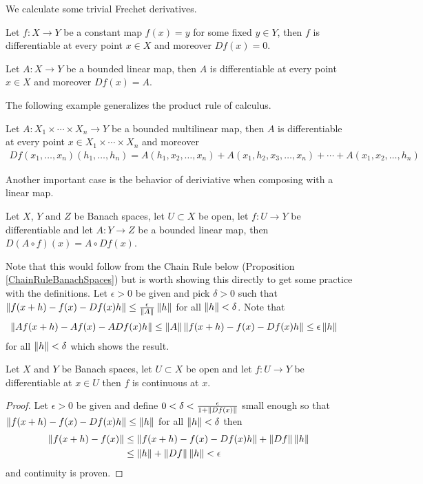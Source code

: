 We calculate some trivial Frechet derivatives.
\begin{examp}Let $f : X \to Y$ be a constant map $f(x) = y$ for some
  fixed $y \in Y$, then $f$ is differentiable at every point $x \in X$
  and moreover $Df(x) = 0$.
\end{examp}
\begin{examp}Let $A : X \to Y$ be a bounded linear map, then $A$ is differentiable at every point $x \in X$
  and moreover $Df(x) = A$.
\end{examp}

The following example generalizes the product rule of calculus.
\begin{examp}Let $A : X_1  \times \dotsm \times X_n \to Y$ be a bounded
  multilinear map, then $A$ is differentiable at every point $x \in
  X_1 \times \dotsm \times X_n$
  and moreover 
\begin{align*}
Df(x_1, \dotsc, x_n)(h_1, \dotsc, h_n) = A(h_1, x_2, \dotsc, x_n) +
  A(x_1, h_2, x_3, \dotsc, x_n) + \dotsm + A(x_1, x_2, \dotsc, h_n)
\end{align*}
\end{examp}

Another important case is the behavior of deriviative when composing
with a linear map.
\begin{examp}\label{FrechetDerivativeCompositionWithLinearMap}Let $X$, $Y$ and $Z$ be Banach spaces, let $U \subset X$
  be open, let $f : U \to Y$ be differentiable and let $A : Y \to Z$
  be a bounded linear map, then $D (A \circ f)(x) = A \circ Df(x)$.

Note that this would follow from the Chain Rule below (Proposition
\ref{ChainRuleBanachSpaces}) but is worth showing this directly to get
some practice with the definitions.  Let $\epsilon > 0$ be given and
pick $\delta>0$ such that $\left \lVert f(x+h) - f(x) - Df(x)h \right \rVert \leq
\frac{\epsilon}{\left \lVert A \right \rVert} \left \lVert h \right \rVert$ for all $\left \lVert h \right \rVert < \delta$.  Note
that
\begin{align*}
\left \lVert Af(x+h) - Af(x) - A Df(x)h \right \rVert &\leq \left \lVert A \right \rVert \left \lVert f(x+h) - f(x) -
                                    Df(x)h \right \rVert \leq \epsilon \left \lVert h \right \rVert
\end{align*}
for all $\left \lVert h \right \rVert < \delta$ which shows the result.
\end{examp}

\begin{prop}\label{DifferentiabilityImpliesContinuity}Let $X$ and $Y$ be Banach spaces, let $U \subset X$ be
  open and let $f : U \to Y$ be differentiable at $x \in U$ then $f$
  is continuous at $x$.
\end{prop}
\begin{proof}
Let $\epsilon > 0$ be given and define $0 < \delta < \frac{\epsilon}{1 + \left \lVert Df(x) \right \rVert}$ small enough so
that $\left \lVert f(x+h) - f(x) - Df(x)h \right \rVert \leq \left \lVert h \right \rVert$ for all $\left \lVert h \right \rVert <
\delta$ then 
\begin{align*}
\left \lVert f(x + h) - f(x) \right \rVert &\leq \left \lVert f(x + h) - f(x) - Df(x)h \right \rVert +
                         \left \lVert Df \right \rVert\left \lVert h \right \rVert \\
&\leq \left \lVert h \right \rVert + \left \lVert Df \right \rVert\left \lVert h \right \rVert < \epsilon
\end{align*}
and continuity is proven.
\end{proof}

